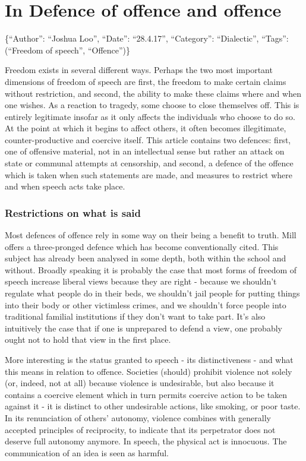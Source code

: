 \section{In Defence of offence and
offence}\label{in-defence-of-offence-and-offence}

\{``Author'': ``Joshua Loo'', ``Date'': ``28.4.17'', ``Category'':
``Dialectic'', ``Tags'': (``Freedom of speech'', ``Offence'')\}

Freedom exists in several different ways. Perhaps the two most important
dimensions of freedom of speech are first, the freedom to make certain
claims without restriction, and second, the ability to make these claims
where and when one wishes. As a reaction to tragedy, some choose to
close themselves off. This is entirely legitimate insofar as it only
affects the individuals who choose to do so. At the point at which it
begins to affect others, it often becomes illegitimate,
counter-productive and coercive itself. This article contains two
defences: first, one of offensive material, not in an intellectual sense
but rather an attack on state or communal attempts at censorship, and
second, a defence of the offence which is taken when such statements are
made, and measures to restrict where and when speech acts take place.

\subsubsection{Restrictions on what is
said}\label{restrictions-on-what-is-said}

Most defences of offence rely in some way on their being a benefit to
truth. Mill offers a three-pronged defence which has become
conventionally cited. This subject has already been analysed in some
depth, both within the school and without. Broadly speaking it is
probably the case that most forms of freedom of speech increase liberal
views because they are right - because we shouldn't regulate what people
do in their beds, we shouldn't jail people for putting things into their
body or other victimless crimes, and we shouldn't force people into
traditional familial institutions if they don't want to take part. It's
also intuitively the case that if one is unprepared to defend a view,
one probably ought not to hold that view in the first place.

More interesting is the status granted to speech - its distinctiveness -
and what this means in relation to offence. Societies (should) prohibit
violence not solely (or, indeed, not at all) because violence is
undesirable, but also because it contains a coercive element which in
turn permits coercive action to be taken against it - it is distinct to
other undesirable actions, like smoking, or poor taste. In its
renunciation of others' autonomy, violence combines with generally
accepted principles of reciprocity, to indicate that its perpetrator
does not deserve full autonomy anymore. In speech, the physical act is
innocuous. The communication of an idea is seen as harmful.

